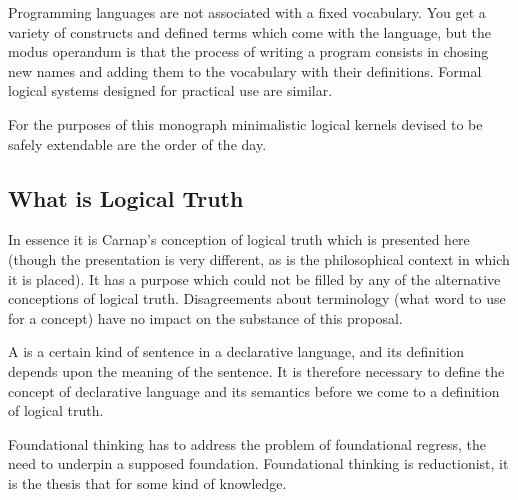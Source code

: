 Programming languages are not associated with a fixed vocabulary.
You get a variety of constructs and defined terms which come with the language, but the modus operandum is that the process of writing a program consists in chosing new names and adding them to the vocabulary with their definitions.
Formal logical systems designed for practical use are similar.

For the purposes of this monograph minimalistic logical kernels devised to be safely extendable are the order of the day.

\subsection{What is Logical Truth}


In essence it is Carnap's conception of logical truth which is presented here %
(though the presentation is very different, as is the philosophical context in which it is placed).
It has a purpose which could not be filled by any of the alternative conceptions of logical truth.
Disagreements about terminology (what word to use for a concept)  have no impact on the substance of this proposal.

A  is a certain kind of sentence in a declarative language, and its definition depends upon the meaning of the sentence.
It is therefore necessary to define the concept of declarative language and its semantics before we come to a definition of logical truth.





Foundational thinking has to address the problem of foundational regress, the need to underpin a supposed foundation.
Foundational thinking is reductionist, it is the thesis that for some kind of knowledge.
